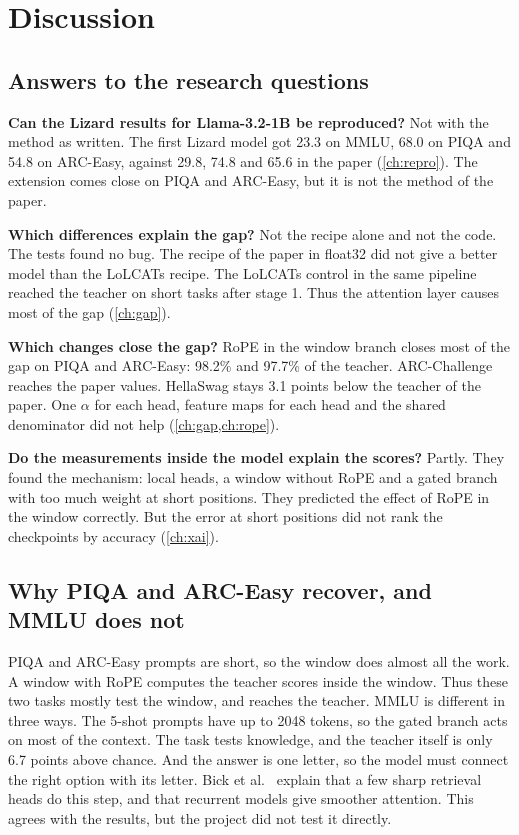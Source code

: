 \chapter{Discussion}
\label{ch:discussion}

\section{Answers to the research questions}
\label{sec:answers}

\begin{description}[leftmargin=1.2cm,style=nextline]
\item[RQ1] \textbf{Can the Lizard results for Llama-3.2-1B be reproduced?} Not with the method as written. The first Lizard model got 23.3 on MMLU, 68.0 on PIQA and 54.8 on ARC-Easy, against 29.8, 74.8 and 65.6 in the paper (\cref{ch:repro}). The extension  comes close on PIQA and ARC-Easy, but it is not the method of the paper.
\item[RQ2] \textbf{Which differences explain the gap?} Not the recipe alone and not the code. The tests found no bug. The recipe of the paper in float32 did not give a better model than the LoLCATs recipe. The LoLCATs control in the same pipeline reached the teacher on short tasks after stage 1. Thus the attention layer causes most of the gap (\cref{ch:gap}).
\item[RQ3] \textbf{Which changes close the gap?} RoPE in the window branch closes most of the gap on PIQA and ARC-Easy: 98.2\% and 97.7\% of the teacher. ARC-Challenge reaches the paper values. HellaSwag stays 3.1 points below the teacher of the paper. One $\alpha$ for each head, feature maps for each head and the shared denominator did not help (\cref{ch:gap,ch:rope}).
\item[RQ4] \textbf{Do the measurements inside the model explain the scores?} Partly. They found the mechanism: local heads, a window without RoPE and a gated branch with too much weight at short positions. They predicted the effect of RoPE in the window correctly. But the error at short positions did not rank the checkpoints by accuracy (\cref{ch:xai}).
\end{description}

\section{Why PIQA and ARC-Easy recover, and MMLU does not}
\label{sec:why-mmlu}

PIQA and ARC-Easy prompts are short, so the window does almost all the work. A window with RoPE computes the teacher scores inside the window. Thus these two tasks mostly test the window, and  reaches the teacher. MMLU is different in three ways. The 5-shot prompts have up to 2048 tokens, so the gated branch acts on most of the context. The task tests knowledge, and the teacher itself is only 6.7 points above chance. And the answer is one letter, so the model must connect the right option with its letter. Bick et al.~\cite{bick2025} explain that a few sharp retrieval heads do this step, and that recurrent models give smoother attention. This agrees with the results, but the project did not test it directly.

